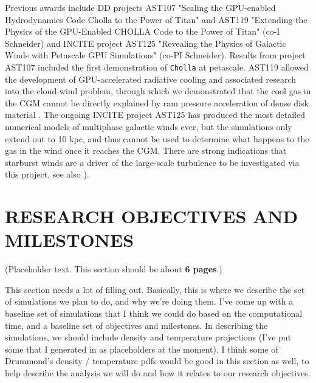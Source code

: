 \documentclass[11pt,letterpaper,english]{article}
\begin{document}
Previous awards include DD projects AST107 "Scaling the GPU-enabled Hydrodynamics Code Cholla to the Power of Titan" and AST119 "Extending the Physics of the GPU-Enabled CHOLLA Code to the Power of Titan" (co-I Schneider) and INCITE project AST125 "Revealing the Physics of Galactic Winds with Petascale GPU Simulations" (co-PI Schneider). Results from project AST107 included the first demonstration of {\tt Cholla} at petascale. AST119 allowed the development of GPU-accelerated radiative cooling and associated research into the cloud-wind problem, through which we demonstrated that the cool gas in the CGM cannot be directly explained by ram pressure acceleration of dense disk material \cite{Schneider17}. The ongoing INCITE project AST125 has produced the most detailed numerical models of multiphase galactic winds ever, but the simulations only extend out to 10 kpc, and thus cannot be used to determine what happens to the gas in the wind once it reaches the CGM. There are strong indications that starburst winds are a driver of the large-scale turbulence to be investigated via this project, see also \cite{Fielding17}).


\vspace{-.25in}
\section{RESEARCH OBJECTIVES AND MILESTONES }  
\vspace{-.2in}

(Placeholder text. This section should be about {\bf 6 pages}.)

This section needs a lot of filling out. Basically, this is where we describe the set of simulations we plan to do, and why we're doing them. I've come up with a baseline set of simulations that I think we could do based on the computational time, and a baseline set of objectives and milestones. In describing the simulations, we should include density and temperature projections (I've put some that I generated in as placeholders at the moment). I think some of Drummond's density / temperature pdfs would be good in this section as well, to help describe the analysis we will do and how it relates to our research objectives.
\end{document}
